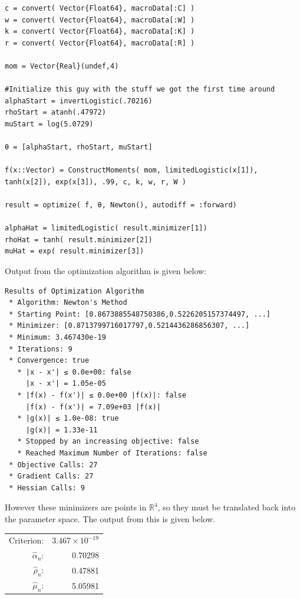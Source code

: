 \documentclass[12pt]{paper}
\newcommand{\setR}{ \mathbb{R} }
\newcommand{\est}[2][n]{ \widehat{ #2 }_{#1}}
\begin{document}
\begin{verbatim}
c = convert( Vector{Float64}, macroData[:C] )
w = convert( Vector{Float64}, macroData[:W] )
k = convert( Vector{Float64}, macroData[:K] )
r = convert( Vector{Float64}, macroData[:R] )

mom = Vector{Real}(undef,4)

#Initialize this guy with the stuff we got the first time around
alphaStart = invertLogistic(.70216)
rhoStart = atanh(.47972)
muStart = log(5.0729)

θ = [alphaStart, rhoStart, muStart]

f(x::Vector) = ConstructMoments( mom, limitedLogistic(x[1]), tanh(x[2]), exp(x[3]), .99, c, k, w, r, W )

result = optimize( f, θ, Newton(), autodiff = :forward)

alphaHat = limitedLogistic( result.minimizer[1])
rhoHat = tanh( result.minimizer[2])
muHat = exp( result.minimizer[3])
\end{verbatim}

Output from the optimization algorithm is given below:

\begin{verbatim}
Results of Optimization Algorithm
 * Algorithm: Newton's Method
 * Starting Point: [0.8673885548750386,0.5226205157374497, ...]
 * Minimizer: [0.8713799716017797,0.5214436286856307, ...]
 * Minimum: 3.467430e-19
 * Iterations: 9
 * Convergence: true
   * |x - x'| ≤ 0.0e+00: false 
     |x - x'| = 1.05e-05 
   * |f(x) - f(x')| ≤ 0.0e+00 |f(x)|: false
     |f(x) - f(x')| = 7.09e+03 |f(x)|
   * |g(x)| ≤ 1.0e-08: true 
     |g(x)| = 1.33e-11 
   * Stopped by an increasing objective: false
   * Reached Maximum Number of Iterations: false
 * Objective Calls: 27
 * Gradient Calls: 27
 * Hessian Calls: 9
\end{verbatim}

However these minimizers are points in $\setR^4$, so they must be
translated back into the parameter space. The output from this is
given below.

\begin{center}
  \begin{tabular}{rr}
    Criterion: & $3.467 \times 10^{-19}$\\
\(\est{\alpha}\): & 0.70298\\
\(\est{\rho}\): & 0.47881\\
\(\est{\mu}\): & 5.05981\\
\end{tabular}
\end{center}
\end{document}
